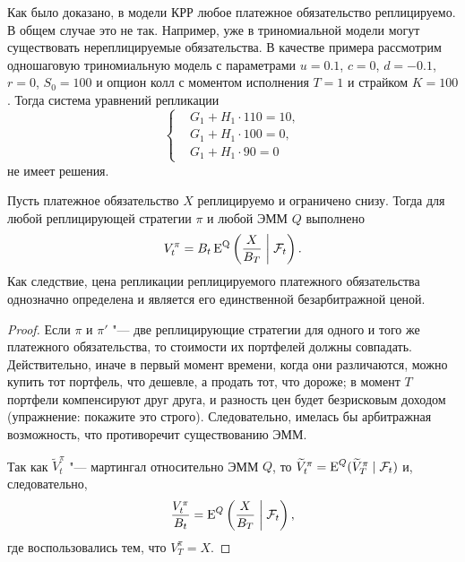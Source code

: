 \begin{remark}
Как было доказано, в модели КРР любое платежное обязательство реплицируемо.
В общем случае это не так.
Например, уже в триномиальной модели могут существовать нереплицируемые обязательства.
В качестве примера рассмотрим одношаговую триномиальную модель с параметрами $u=0.1$, $c=0$, $d=-0.1$, $r=0$, $S_0=100$ и опцион колл с моментом исполнения $T=1$ и страйком $K=100$.
Тогда система уравнений репликации 
\[
\left\{
\begin{aligned}
&G_1 + H_1\cdot 110 = 10,\\
&G_1 + H_1\cdot 100 = 0,\\
&G_1 + H_1\cdot 90 = 0
\end{aligned}
\right.
\]
не имеет решения.
\end{remark}

\begin{proposition}
\label{gen:p:price}
Пусть платежное обязательство $X$ реплицируемо и ограничено снизу.
Тогда для любой реплицирующей стратегии $\pi$ и любой ЭММ $Q$ выполнено
\[
V_t^\pi = B_t\operatorname{E}^{\mathrm{Q}} \left( \frac{X}{B_T} \;\bigg|\; \mathcal{F}_t \right).
\]
Как следствие, цена репликации реплицируемого платежного обязательства однозначно определена и является его единственной безарбитражной ценой.
\end{proposition}

\begin{proof}
Если $\pi$ и $\pi'$ "--- две реплицирующие стратегии для одного и того же платежного обязательства, то стоимости их портфелей должны совпадать.
Действительно, иначе в первый момент времени, когда они различаются, можно купить тот портфель, что дешевле, а продать тот, что дороже; в момент $T$ портфели компенсируют друг друга, и разность цен будет безрисковым доходом (упражнение: покажите это строго).
Следовательно, имелась бы арбитражная возможность, что противоречит существованию ЭММ.

Так как $\tilde V_t^\pi$ "--- мартингал относительно ЭММ $Q$, то $\widetilde V_t^\pi = \operatorname{E}^Q(\widetilde V_T^\pi \mid \mathcal{F}_t)$ и, следовательно, 
\[
\frac{V_t^\pi}{B_t} = \operatorname{E}^Q\left(\frac{X}{B_T} \;\bigg|\; \mathcal{F}_t\right),
\]
где воспользовались тем, что $V_T^\pi = X$.
\end{proof}

